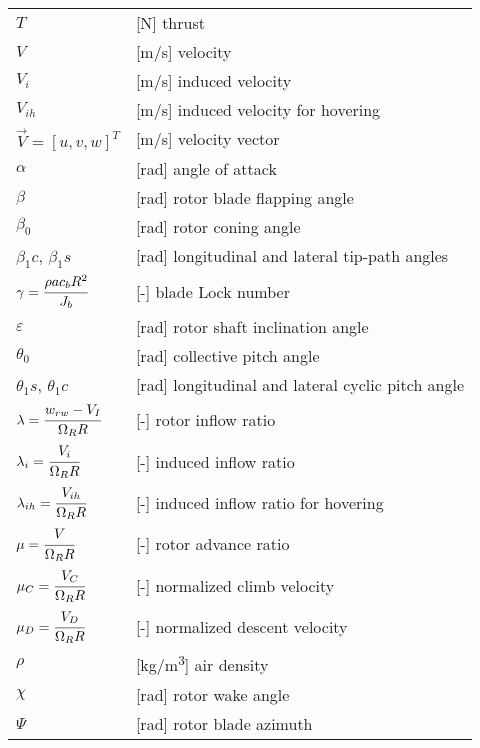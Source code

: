 \begin{longtable}[l]{ l p{} }
  $T$                                        & [N] thrust \\
  $V$                                        & [m/s] velocity \\
  $V_i$                                      & [m/s] induced velocity \\
  $V_{ih}$                                   & [m/s] induced velocity for hovering \\
  $\vec V=\left[ u, v, w \right]^T$          & [m/s] velocity vector \\
  $\alpha$                                   & [rad] angle of attack \\
  $\beta$                                    & [rad] rotor blade flapping angle \\
  $\beta_0$                                  & [rad] rotor coning angle \\
  $\beta_1c$, $\beta_1s$                     & [rad] longitudinal and lateral tip-path angles \\
  $\gamma=\cfrac{\rho a c_b R^2}{J_b}$       & [-] blade Lock number \\
  $\varepsilon$                              & [rad] rotor shaft inclination angle \\
  $\theta_0$                                 & [rad] collective pitch angle \\
  $\theta_1s$, $\theta_1c$                   & [rad] longitudinal and lateral cyclic pitch angle \\
  $\lambda=\cfrac{w_{rw} - V_I}{\Omega_R R}$ & [-] rotor inflow ratio \\
  $\lambda_i=\cfrac{V_i}{\Omega_R R}$        & [-] induced inflow ratio \\
  $\lambda_{ih}=\cfrac{V_{ih}}{\Omega_R R}$  & [-] induced inflow ratio for hovering \\
  $\mu=\cfrac{V}{\Omega_R R}$                & [-] rotor advance ratio \\
  $\mu_C=\cfrac{V_C}{\Omega_R R}$            & [-] normalized climb velocity \\
  $\mu_D=\cfrac{V_D}{\Omega_R R}$            & [-] normalized descent velocity \\
  $\rho$                                     & [kg/m\textsuperscript{3}] air density \\
  $\chi$                                     & [rad] rotor wake angle \\
  $\Psi$                                     & [rad] rotor blade azimuth \\

\end{longtable}
